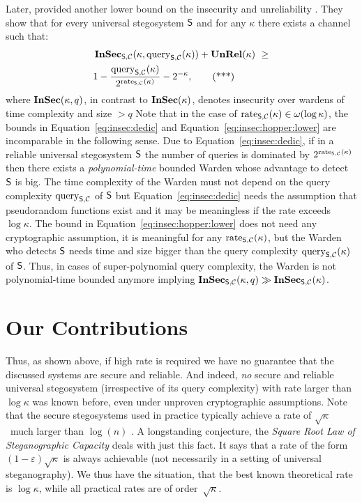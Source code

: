 Later, \citeauthor{hopper2009provably} provided another lower 
bound on the insecurity and unreliability  \cite[Theorem 5]{hopper2009provably} .
They show that for every universal stegosystem $\operatorname{\mathsf{S}}$
and for any $\kappa$ there exists a channel such that: 
\begin{align*} 
&  \operatorname{\mathbf{InSec}}_{\operatorname{\mathsf{S}},\mathcal{C}}(\kappa,\operatorname{query}_{\operatorname{\mathsf{S}},\mathcal{C}}(\kappa)) + \operatorname{\mathbf{UnRel}}(\kappa) \  \ge\\
    &1-  \frac{\operatorname{query}_{\operatorname{\mathsf{S}},\mathcal{C}}(\kappa)}{2^{\operatorname{rate}_{\operatorname{\mathsf{S}},\mathcal{C}}(\kappa)}} -2^{-\kappa},
  \tag{***}
  \label{eq:insec:hopper:lower}
\end{align*}
where $\operatorname{\mathbf{InSec}}(\kappa,q)$, in contrast to $\operatorname{\mathbf{InSec}}(\kappa)$, denotes insecurity over wardens of time 
complexity and size $> q$
%
Note that in the case of $\operatorname{rate}_{\operatorname{\mathsf{S}},\mathcal{C}}(\kappa)\in \omega(\log \kappa)$, %
the bounds in Equation~\eqref{eq:insec:dedic}
and Equation~\eqref{eq:insec:hopper:lower}
are incomparable in the following sense.
Due to Equation~\eqref{eq:insec:dedic}, if 
in a reliable universal stegosystem $\operatorname{\mathsf{S}}$
the number of queries is dominated by $2^{\operatorname{rate}_{\operatorname{\mathsf{S}},\mathcal{C}}(\kappa)}$ 
then there exists a \emph{polynomial-time} bounded Warden 
whose advantage to detect $\operatorname{\mathsf{S}}$ is big. 
The time complexity of the Warden 
must not depend on the query complexity $\operatorname{query}_{\operatorname{\mathsf{S}},\mathcal{C}}$ of $\operatorname{\mathsf{S}}$
but Equation~\eqref{eq:insec:dedic}
needs the 
assumption that pseudorandom functions exist
and it may be meaningless if the rate exceeds $\log \kappa$.
The bound in Equation~\eqref{eq:insec:hopper:lower} does 
not need any cryptographic assumption, it is meaningful
for any $\operatorname{rate}_{\operatorname{\mathsf{S}},\mathcal{C}}(\kappa)$, but the Warden who detects $\operatorname{\mathsf{S}}$ 
needs time and size bigger than the query complexity $\operatorname{query}_{\operatorname{\mathsf{S}},\mathcal{C}}(\kappa)$ of $\operatorname{\mathsf{S}}$.
Thus, in cases of super-polynomial query complexity, the Warden is not 
polynomial-time bounded anymore implying $\operatorname{\mathbf{InSec}}_{\operatorname{\mathsf{S}},\mathcal{C}}(\kappa,q) \gg\operatorname{\mathbf{InSec}}_{\operatorname{\mathsf{S}},\mathcal{C}}(\kappa)$.


\section{Our Contributions}

Thus, as shown above, if high rate is required we have no guarantee that the
discussed systems are %
secure and reliable. And indeed, \emph{no} secure
and reliable universal stegosystem (irrespective of its query complexity) 
with rate larger than $\log \kappa$ was known before, even under unproven 
cryptographic assumptions.  
Note that the secure stegosystems used
in practice typically achieve a rate of  $\sqrt{\kappa}$
 \textendash\ much larger than $\log(n)$ \cite{ker2013moving}.
A longstanding conjecture, the \emph{Square Root Law of Steganographic
Capacity} \cite{filler2009squaremarkov, ker2008square} 
deals with just this fact. It says that a rate
of the form $(1-\varepsilon)\sqrt{\kappa}$ is always achievable (not necessarily
in a setting of universal steganography).
We thus have the situation, that the best known theoretical rate is
$\log \kappa$, while all practical rates are of order~$\sqrt{\kappa}$.  


